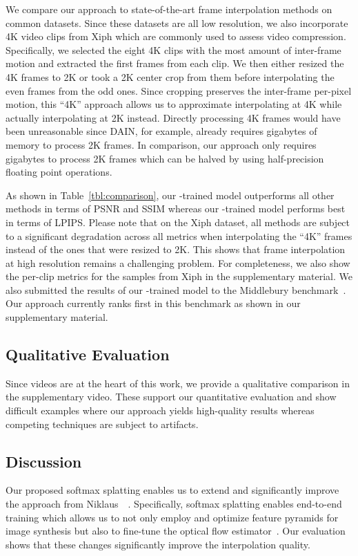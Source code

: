 \documentclass[10pt,twocolumn,letterpaper]{article}
\begin{document}
We compare our approach to state-of-the-art frame interpolation methods on common datasets. Since these datasets are all low resolution, we also incorporate 4K video clips from Xiph which are commonly used to assess video compression. Specifically, we selected the eight 4K clips with the most amount of inter-frame motion and extracted the first  frames from each clip. We then either resized the 4K frames to 2K or took a 2K center crop from them before interpolating the even frames from the odd ones. Since cropping preserves the inter-frame per-pixel motion, this ``4K'' approach allows us to approximate interpolating at 4K while actually interpolating at 2K instead. Directly processing 4K frames would have been unreasonable since DAIN, for example, already requires  gigabytes of memory to process 2K frames. In comparison, our approach only requires  gigabytes to process 2K frames which can be halved by using half-precision floating point operations.

As shown in Table~\ref{tbl:comparison}, our -trained model outperforms all other methods in terms of PSNR and SSIM whereas our -trained model performs best in terms of LPIPS. Please note that on the Xiph dataset, all methods are subject to a significant degradation across all metrics when interpolating the ``4K'' frames instead of the ones that were resized to 2K. This shows that frame interpolation at high resolution remains a challenging problem. For completeness, we also show the per-clip metrics for the samples from Xiph in the supplementary material. We also submitted the results of our -trained model to the Middlebury benchmark~\cite{Baker_IJCV_2011}. Our approach currently ranks first in this benchmark as shown in our supplementary material.

\subsection{Qualitative Evaluation} 

Since videos are at the heart of this work, we provide a qualitative comparison in the supplementary video. These support our quantitative evaluation and show difficult examples where our approach yields high-quality results whereas competing techniques are subject to artifacts.

\subsection{Discussion}

Our proposed softmax splatting enables us to extend and significantly improve the approach from Niklaus~\etal~\cite{Niklaus_CVPR_2018}. Specifically, softmax splatting enables end-to-end training which allows us to not only employ and optimize feature pyramids for image synthesis but also to fine-tune the optical flow estimator~\cite{Xue_IJCV_2019}. Our evaluation shows that these changes significantly improve the interpolation quality.
\end{document}

